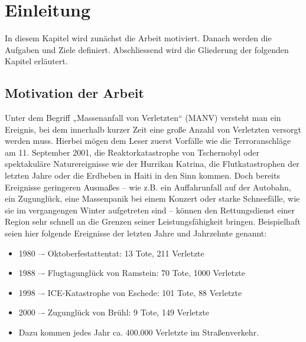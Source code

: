\chapter{Einleitung}

In diesem Kapitel wird zunächst die Arbeit motiviert. Danach werden die Aufgaben und
Ziele definiert. Abschliessend wird die Gliederung der folgenden Kapitel erläutert.

\section{Motivation der Arbeit}
Unter dem Begriff „Massenanfall von Verletzten“ (MANV) versteht man ein Ereignis, bei dem innerhalb
kurzer Zeit eine große Anzahl von Verletzten versorgt werden muss. Hierbei mögen dem Leser zuerst
Vorfälle wie die Terroranschläge am 11. September 2001, die Reaktorkatastrophe von Tschernobyl oder
spektakuläre Naturereignisse wie der Hurrikan Katrina, die Flutkatastrophen der letzten Jahre oder die
Erdbeben in Haiti in den Sinn kommen.
Doch bereits Ereignisse geringeren Ausmaßes -- wie z.B. ein Auffahrunfall auf der Autobahn, ein
Zugunglück, eine Massenpanik bei einem Konzert oder starke Schneefälle, wie sie im vergangengen
Winter aufgetreten sind -- können den Rettungsdienst einer Region sehr schnell an die Grenzen seiner
Leistungsfähigkeit bringen.
Beispielhaft seien hier folgende Ereignisse der letzten Jahre und Jahrzehnte genannt:

\begin{itemize}
    \item 1980 –- Oktoberfestattentat: 13 Tote, 211 Verletzte
    \item 1988 –- Flugtagunglück von Ramstein: 70 Tote, 1000 Verletzte
    \item 1998 –- ICE-Katastrophe von Eschede: 101 Tote, 88 Verletzte
    \item 2000 –- Zugunglück von Brühl: 9 Tote, 149 Verletzte
    \item Dazu kommen jedes Jahr ca. 400.000 Verletzte im Straßenverkehr.
\end{itemize}

